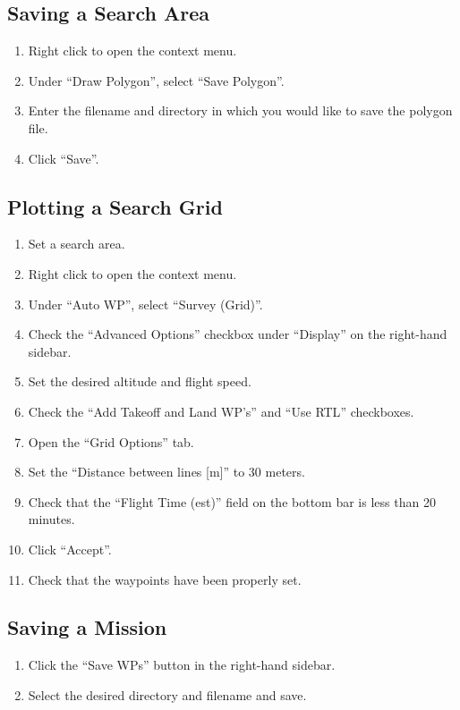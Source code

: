 \documentclass{report}
\begin{document}
		\subsection{Saving a Search Area}
			\begin{enumerate}
				\item Right click to open the context menu.
				\item Under ``Draw Polygon'', select ``Save Polygon''.
				\item Enter the filename and directory in which you would like to save the polygon file.
				\item Click ``Save''.
			\end{enumerate}
		\subsection{Plotting a Search Grid}
			\begin{enumerate}
				\item Set a search area.
				\item Right click to open the context menu.
				\item Under ``Auto WP'', select ``Survey (Grid)''.
				\item Check the ``Advanced Options'' checkbox under ``Display'' on the right-hand sidebar.
				\item Set the desired altitude and flight speed.
				\item Check the ``Add Takeoff and Land WP's'' and ``Use \gls{RTL}'' checkboxes.
				\item Open the ``Grid Options'' tab.
				\item Set the ``Distance between lines [m]'' to 30 meters.
				\item Check that the ``Flight Time (est)'' field on the bottom bar is less than 20 minutes.
				\item Click ``Accept''.
				\item Check that the waypoints have been properly set.
			\end{enumerate}
		\subsection{Saving a Mission}
			\begin{enumerate}
				\item Click the ``Save WPs'' button in the right-hand sidebar.
				\item Select the desired directory and filename and save.
			\end{enumerate}
\end{document}
